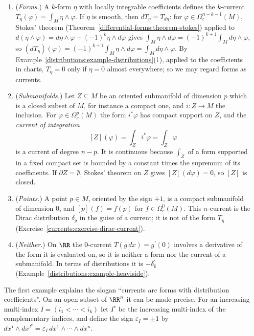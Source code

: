 \begin{example}\label{currents:example-currents-manifold}
\begin{enumerate}
\item (\emph{Forms.}) A $k$-form $\eta$ with locally integrable coefficients defines the $k$-current $T_\eta(\varphi) = \int_M\eta \wedge \varphi$. If $\eta$ is smooth, then $dT_\eta = T_{d\eta}$:
for $\varphi \in \Omega^{n-k-1}_c(M)$, Stokes' theorem (Theorem~\ref{differential-forms:theorem-stokes}) applied to $d(\eta \wedge \varphi) = d\eta \wedge \varphi + (-1)^k\eta \wedge d\varphi$ gives
$\int_M\eta \wedge d\varphi = (-1)^{k+1}\int_Md\eta \wedge \varphi$, so $(dT_\eta)(\varphi) = (-1)^{k+1}\int_M\eta \wedge d\varphi = \int_Md\eta \wedge \varphi$. By
Example~\ref{distributions:example-distributions}(1), applied to the coefficients in charts, $T_\eta = 0$ only if $\eta = 0$ almost everywhere; so we may regard forms as currents.
\item (\emph{Submanifolds.}) Let $Z \subseteq M$ be an oriented submanifold of dimension $p$ which is a closed subset of $M$, for instance a compact one, and $i \colon Z \to M$ the inclusion. For
$\varphi \in \Omega^p_c(M)$ the form $i^*\varphi$ has compact support on $Z$, and the \emph{current of integration}
\[
[Z](\varphi) = \int_Zi^*\varphi = \int_Z\varphi
\]
is a current of degree $n - p$. It is continuous because $\int_Z$ of a form supported in a fixed compact set is bounded by a constant times the supremum of its coefficients. If
$\partial Z = \emptyset$, Stokes' theorem on $Z$ gives $[Z](d\varphi) = 0$, so $[Z]$ is closed.
\item (\emph{Points.}) A point $p \in M$, oriented by the sign $+1$, is a compact submanifold of dimension $0$, and $[p](f) = f(p)$ for $f \in \Omega^0_c(M)$. This $n$-current is the Dirac distribution
$\delta_p$ in the guise of a current; it is not of the form $T_\eta$ (Exercise~\ref{currents:exercise-dirac-current}).
\item (\emph{Neither.}) On $\RR$ the $0$-current $T(g\,dx) = g^{\prime}(0)$ involves a derivative of the form it is evaluated on, so it is neither a form nor the current of a submanifold. In
terms of distributions it is $-\delta_0^{\prime}$ (Example~\ref{distributions:example-heaviside}).
\end{enumerate}
\end{example}

The first example explains the slogan ``currents are forms with distribution coefficients''. On an open subset of $\RR^n$ it can be made precise. For an increasing multi-index
$I = (i_1 < \cdots < i_k)$ let $I^c$ be the increasing multi-index of the complementary indices, and define the sign $\varepsilon_I = \pm1$ by
$dx^I \wedge dx^{I^c} = \varepsilon_I\,dx^1 \wedge \cdots \wedge dx^n$.

